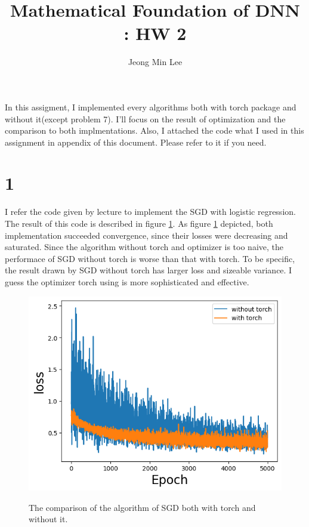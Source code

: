 \documentclass[10pt]{article}
\title{\textbf{Mathematical Foundation of DNN : HW 2}}
\author{Jeong Min Lee}
\begin{document}
\maketitle
In this assigment, I implemented every algorithms both with torch package and without it(except problem 7). 
I'll focus on the result of optimization and the comparison to both implmentations. Also, I attached the code what I used in this assignment in appendix of this document. Please refer to it if you need.
\section*{1}

I refer the code given by lecture to implement the SGD with logistic regression. The result of this code is 
described in figure \ref{fig1}. As figure \ref{fig1} depicted, both implementation succeeded convergence, since their losses were decreasing and saturated.
Since the algorithm without torch and optimizer is too naive, the performace of SGD without torch is worse than that with torch. To be specific, 
the result drawn by SGD without torch has larger loss and sizeable variance. I guess the optimizer torch using is more sophisticated and effective. 

\begin{figure}[!h]
    \begin{center}
        \includegraphics[scale = 0.5]{../hw2/fig/prob1.png}
        \label{fig1}
    \end{center}
    \caption{The comparison of the algorithm of SGD both with torch and without it.}
\end{figure}
\end{document}
